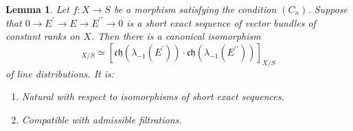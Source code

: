 \documentclass[11pt]{article}
\theoremstyle{plain}
\newtheorem{lemma}[theorem]{Lemma}
\theoremstyle{definition}
\newcommand{\chfrak}{\mathfrak {ch}}
\newcommand{\bis}{\prime\prime}
\begin{document}
\begin{lemma}\label{lemma:lambda-1mult}
Let $f\colon X\to S$ be a morphism satisfying the condition $(C_{n})$. Suppose that $0 \to E^{\prime} \to E \to E^{\bis}\to 0 $ is a short exact sequence of vector bundles of constant ranks on $X$. Then there is a canonical isomorphism
\begin{displaymath}
[ \chfrak(\lambda_{-1}(E)) ]_{X/S} \simeq [ \chfrak(\lambda_{-1}(E^{\prime})) \cdot \chfrak(\lambda_{-1}(E^{\bis})) ]_{X/S}
\end{displaymath}
of line distributions. It is:
\begin{enumerate}
\item Natural with respect to isomorphisms of short exact sequences.
\item Compatible with admissible filtrations.
\end{enumerate}
\end{lemma}
\end{document}
